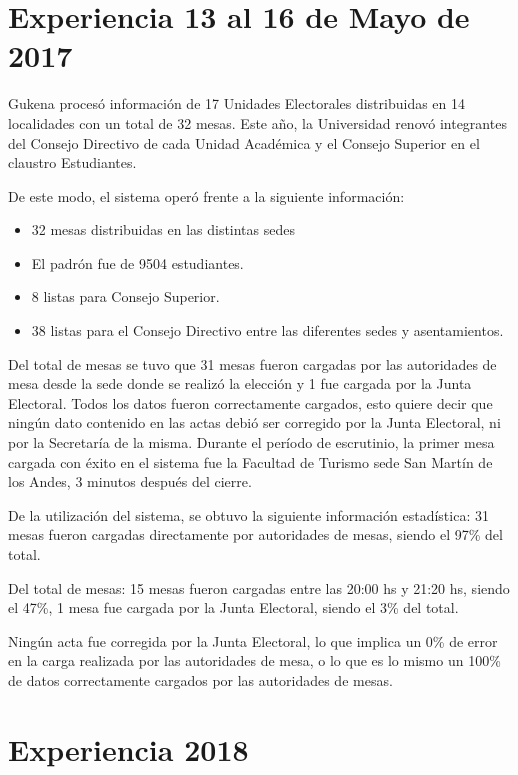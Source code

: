 \section{Experiencia 13 al 16 de Mayo de 2017}
Gukena procesó información de 17 Unidades Electorales distribuidas en 14 localidades con un total de 32 mesas. Este año, la Universidad renovó integrantes del Consejo Directivo de cada Unidad Académica y el Consejo Superior en el claustro Estudiantes.

De este modo, el sistema operó frente a la siguiente información:
\begin{itemize}
    \item 32 mesas distribuidas en las distintas sedes
    \item El padrón fue de 9504 estudiantes.
    \item 8 listas para Consejo Superior.
    \item 38 listas para el Consejo Directivo entre las diferentes sedes y asentamientos.
\end{itemize}
  
Del total de mesas se tuvo que 31 mesas fueron cargadas por las autoridades de mesa desde la sede donde se realizó la elección y 1 fue cargada por la Junta Electoral. Todos los datos fueron correctamente cargados, esto quiere decir que ningún dato contenido en las actas debió ser corregido por la Junta Electoral, ni por la Secretaría de la misma.
Durante el período de escrutinio, la primer mesa cargada con éxito en el sistema fue la Facultad de Turismo sede San Martín de los Andes, 3 minutos después del cierre.

De la utilización del sistema, se obtuvo la siguiente información estadística:
31 mesas fueron cargadas directamente por autoridades de mesas, siendo el 97\% del total.

Del total de mesas:
15 mesas fueron cargadas entre las 20:00 hs y 21:20 hs, siendo el 47\%,
1 mesa fue cargada 	por la Junta Electoral, siendo el 3\% del total.

Ningún acta fue corregida por la Junta Electoral, lo que implica un 0\% de error en la carga realizada por las autoridades de mesa, o lo que es lo mismo un 100\% de datos correctamente cargados por las autoridades de mesas.

\section{Experiencia 2018}
